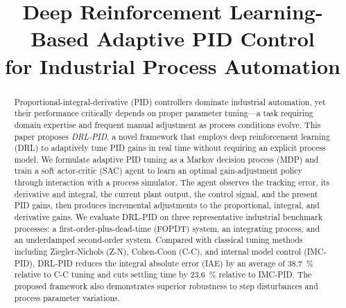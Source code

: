 \documentclass[conference,a4paper]{IEEEtran}[2015/08/26]
\begin{document}

\title{Deep Reinforcement Learning-Based Adaptive {PID} Control\\
       for Industrial Process Automation}

\author{%
}

\maketitle


\begin{abstract}
Proportional-integral-derivative (PID) controllers dominate industrial
automation, yet their performance critically depends on proper parameter
tuning---a task requiring domain expertise and frequent manual adjustment
as process conditions evolve. This paper proposes \emph{DRL-PID}, a
novel framework that employs deep reinforcement learning (DRL) to
adaptively tune PID gains in real time without requiring an explicit
process model. We formulate adaptive PID tuning as a Markov decision
process (MDP) and train a soft actor-critic (SAC) agent to learn an
optimal gain-adjustment policy through interaction with a process
simulator. The agent observes the tracking error, its derivative and
integral, the current plant output, the control signal, and the
present PID gains, then produces incremental adjustments to the
proportional, integral, and derivative gains. We evaluate DRL-PID on
three representative industrial benchmark processes: a
first-order-plus-dead-time (FOPDT) system, an integrating process, and
an underdamped second-order system. Compared with classical tuning
methods including Ziegler-Nichols (Z-N), Cohen-Coon (C-C), and internal
model control (IMC-PID), DRL-PID reduces the integral absolute error
(IAE) by an average of \SI{38.7}{\percent} relative to C-C tuning and
cuts settling time by \SI{23.6}{\percent} relative to IMC-PID. The
proposed framework also demonstrates superior robustness to step
disturbances and process parameter variations.
\end{abstract}
\end{document}
